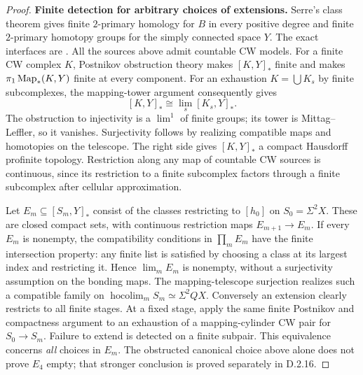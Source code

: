 \begin{proof}
\medskip\noindent
\textbf{Finite detection for arbitrary choices of extensions.}
Serre's class theorem gives finite $2$-primary homology for $B$
in every positive degree and finite $2$-primary homotopy groups
for the simply connected space $Y$. The exact interfaces are
\cite[Chapter I, \S6.4; Chapter II, Proposition~8; Chapter III,
Theorem~1 and Corollaries~1--2, pp.~265, 271--274]{I_SerreClasses1953}.
All the sources above admit countable CW models. For a finite
CW complex $K$, Postnikov obstruction theory makes $[K,Y]_*$
finite and makes $\pi_1\operatorname{Map}_*(K,Y)$ finite at every component.
For an exhaustion $K=\bigcup K_s$ by finite subcomplexes,
the mapping-tower argument consequently gives
\[
 [K,Y]_*\cong\lim_s[K_s,Y]_*.
 \tag{D.2.13p}
\]
The obstruction to injectivity is a $\lim^1$ of finite groups;
its tower is Mittag--Leffler, so it vanishes. Surjectivity follows
by realizing compatible maps and homotopies on the telescope.
The right side gives $[K,Y]_*$ a compact Hausdorff profinite
topology. Restriction along any map of countable CW sources is
continuous, since its restriction to a finite subcomplex factors
through a finite subcomplex after cellular approximation.

Let $E_m\subseteq[S_m,Y]_*$ consist of the classes restricting
to $[h_0]$ on $S_0=\Sigma^2X$. These are closed compact sets, with
continuous restriction maps $E_{m+1}\to E_m$. If every $E_m$
is nonempty, the compatibility conditions in $\prod_mE_m$ have
the finite intersection property: any finite list is satisfied
by choosing a class at its largest index and restricting it.
Hence $\lim_mE_m$ is nonempty, without a surjectivity assumption
on the bonding maps. The mapping-telescope surjection realizes
such a compatible family on
$\operatorname{hocolim}_mS_m\simeq\Sigma^2QX$.
Conversely an extension clearly restricts to all finite stages.
At a fixed stage, apply the same finite Postnikov and compactness
argument to an exhaustion of a mapping-cylinder CW pair for
$S_0\to S_m$. Failure to extend is detected on a finite subpair.
This equivalence concerns \emph{all} choices in $E_m$. The
obstructed canonical choice above alone does not prove $E_4$ empty;
that stronger conclusion is proved separately in D.2.16.
\end{proof}
